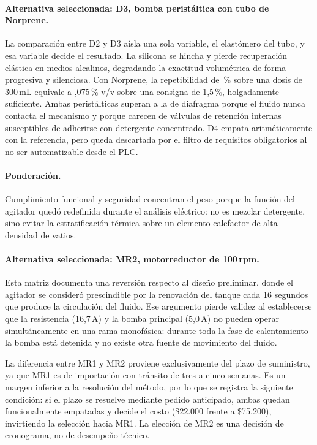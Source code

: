 \paragraph{Alternativa seleccionada: D3, bomba peristáltica con tubo de Norprene.} La comparación entre D2 y D3 aísla una sola variable, el elastómero del tubo, y esa variable decide el resultado. La silicona se hincha y pierde recuperación elástica en medios alcalinos, degradando la exactitud volumétrica de forma progresiva y silenciosa. Con Norprene, la repetibilidad de \,\% sobre una dosis de 300\,mL equivale a ,075\,\% v/v sobre una consigna de 1,5\,\%, holgadamente suficiente. Ambas peristálticas superan a la de diafragma porque el fluido nunca contacta el mecanismo y porque carecen de válvulas de retención internas susceptibles de adherirse con detergente concentrado. D4 empata aritméticamente con la referencia, pero queda descartada por el filtro de requisitos obligatorios al no ser automatizable desde el PLC.



\paragraph{Ponderación.} Cumplimiento funcional y seguridad concentran el peso porque la función del agitador quedó redefinida durante el análisis eléctrico: no es mezclar detergente, sino evitar la estratificación térmica sobre un elemento calefactor de alta densidad de vatios.

\paragraph{Alternativa seleccionada: MR2, motorreductor de 100\,rpm.} Esta matriz documenta una reversión respecto al diseño preliminar, donde el agitador se consideró prescindible por la renovación del tanque cada 16 segundos que produce la circulación del fluido. Ese argumento pierde validez al establecerse que la resistencia (16,7\,A) y la bomba principal (5,0\,A) no pueden operar simultáneamente en una rama monofásica: durante toda la fase de calentamiento la bomba está detenida y no existe otra fuente de movimiento del fluido.

La diferencia entre MR1 y MR2 proviene exclusivamente del plazo de suministro, ya que MR1 es de importación con tránsito de tres a cinco semanas. Es un margen inferior a la resolución del método, por lo que se registra la siguiente condición: si el plazo se resuelve mediante pedido anticipado, ambas quedan funcionalmente empatadas y decide el costo (\$22.000 frente a \$75.200), invirtiendo la selección hacia MR1. La elección de MR2 es una decisión de cronograma, no de desempeño técnico.

